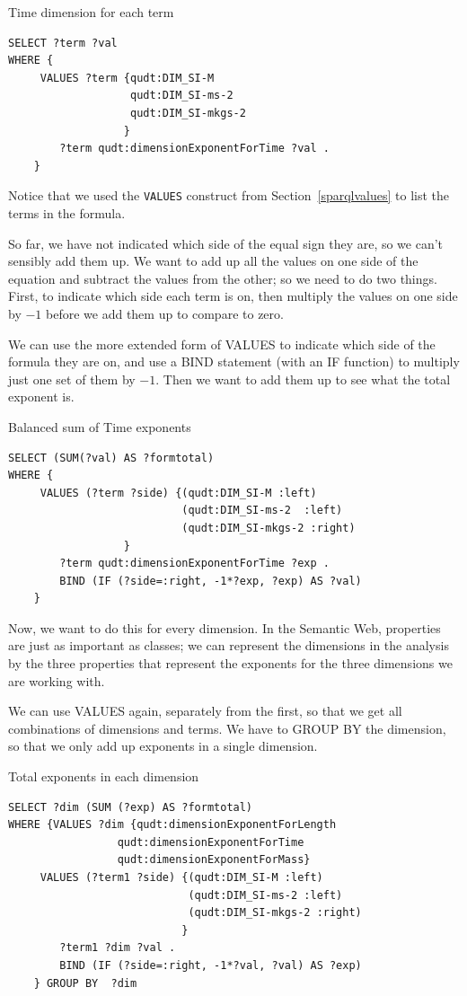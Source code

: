 \begin{query}Time dimension for each term\end{query}
\begin{lstlisting}
SELECT ?term ?val
WHERE { 
     VALUES ?term {qudt:DIM_SI-M
                   qudt:DIM_SI-ms-2 
                   qudt:DIM_SI-mkgs-2 
                  }
        ?term qudt:dimensionExponentForTime ?val .
    } 
\end{lstlisting}

Notice that we used the \texttt{VALUES} construct from Section~\ref{sparqlvalues} to 
list the terms in the formula.  

So far, we have not indicated which side of the equal sign they
are, so we can't sensibly add them up.  We want to add up all the 
values on one side of the equation and subtract the values from the other;
so we need to do two things.  First, to indicate which side each term is on,
then multiply the values on one side by $-1$ before we add them up to 
compare to zero.   

We can use the more extended form of VALUES to indicate which side of the 
formula they are on, and use a BIND statement (with an IF function) to 
multiply just one set of them by $-1$.  Then we want to add them up to 
see what the total exponent is. 

\begin{query}Balanced sum of Time exponents\end{query}
\begin{lstlisting}
SELECT (SUM(?val) AS ?formtotal)
WHERE { 
     VALUES (?term ?side) {(qudt:DIM_SI-M :left)
                           (qudt:DIM_SI-ms-2  :left)
                           (qudt:DIM_SI-mkgs-2 :right)
                  }
        ?term qudt:dimensionExponentForTime ?exp .
        BIND (IF (?side=:right, -1*?exp, ?exp) AS ?val)
    } 
\end{lstlisting}

Now, we want to do this for every dimension.  In the Semantic Web, properties
are just as important as classes; we can represent the dimensions in the 
analysis by the three properties that represent the exponents for the three 
dimensions we are working with.  

We can use VALUES again, separately from the first, so that we get all combinations 
of dimensions and terms.  We have to GROUP BY the dimension, so that we only add up
exponents in a single dimension. 

\begin{query}Total exponents in each dimension\end{query}
\begin{lstlisting}
SELECT ?dim (SUM (?exp) AS ?formtotal)
WHERE {VALUES ?dim {qudt:dimensionExponentForLength 
                 qudt:dimensionExponentForTime 
                 qudt:dimensionExponentForMass}
     VALUES (?term1 ?side) {(qudt:DIM_SI-M :left)
                            (qudt:DIM_SI-ms-2 :left)
                            (qudt:DIM_SI-mkgs-2 :right)
                           }
        ?term1 ?dim ?val .
        BIND (IF (?side=:right, -1*?val, ?val) AS ?exp)
    } GROUP BY  ?dim 
\end{lstlisting}


